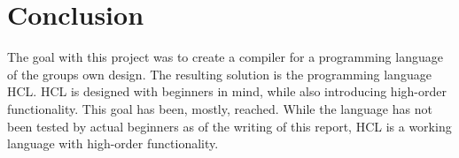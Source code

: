 \section{Conclusion}
The goal with this project was to create a compiler for a programming language of the groups own design.
The resulting solution is the programming language HCL.
HCL is designed with beginners in mind, while also introducing high-order functionality.
This goal has been, mostly, reached.
While the language has not been tested by actual beginners as of the writing of this report, HCL is a working language with high-order functionality.


